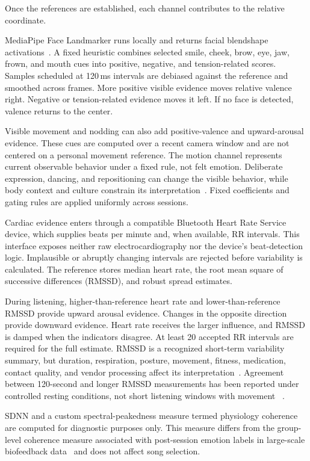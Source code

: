 Once the references are established, each channel contributes to the relative
coordinate.

MediaPipe Face Landmarker runs locally and returns facial blendshape
activations~\cite{mediapipe2019,mediapipeface2026}. A fixed heuristic combines selected smile,
cheek, brow, eye, jaw, frown, and mouth cues into positive, negative, and
tension-related scores. Samples scheduled at 120\,ms intervals are debiased
against the reference and smoothed across frames. More positive visible
evidence moves relative valence right. Negative or tension-related evidence
moves it left. If no face is detected, valence returns to the center.

Visible movement and nodding can also add positive-valence and upward-arousal
evidence. These cues are computed over a recent camera window and are not
centered on a personal movement reference. The motion channel represents current
observable behavior under a fixed rule, not felt emotion. Deliberate expression, dancing, and repositioning can
change the visible behavior, while body context and culture constrain its
interpretation~\cite{barrett2019,aviezer2012,kuppens2017}. Fixed coefficients and gating
rules are applied uniformly across sessions.

Cardiac evidence enters through a compatible Bluetooth Heart Rate Service
device, which supplies beats per minute and, when available, RR intervals. This
interface exposes neither raw electrocardiography nor the device's
beat-detection logic. Implausible or abruptly changing intervals are rejected
before variability is calculated.
The reference stores median heart rate, the root mean square of successive
differences (RMSSD), and robust spread estimates.

During listening, higher-than-reference heart rate and lower-than-reference
RMSSD provide upward arousal evidence. Changes in the opposite direction
provide downward evidence. Heart rate receives the larger influence, and
RMSSD is damped when the indicators disagree. At least 20 accepted RR
intervals are required for the full estimate. RMSSD is a recognized
short-term variability summary, but duration, respiration, posture, movement,
fitness, medication, contact quality, and vendor processing affect its
interpretation~\cite{shaffer2017,laborde2017,quigley2024}. Agreement between
120-second and longer RMSSD measurements has been reported under controlled
resting conditions, not short listening windows with movement
~\cite{munoz2015}.

SDNN and a custom spectral-peakedness measure termed physiology coherence are
computed for diagnostic purposes only. This measure differs from the
group-level coherence measure associated with post-session emotion labels in
large-scale biofeedback data~\cite{balaji2025} and does not affect song
selection.

